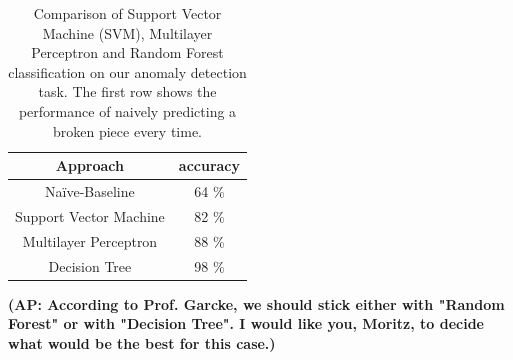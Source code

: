 \documentclass[5p,times,procedia]{elsarticle}
\newcommand{\AP}[1]{{\color{blue} {\bf (AP: #1)}}}
\begin{document}
\begin{table}
       \centering
       \begin{tabular}{ c c } \toprule
              Approach         & accuracy \\ \midrule
              Na\"ive-Baseline & 64 \% \\
              Support Vector Machine & 82 \% \\
              Multilayer Perceptron & 88 \% \\
              Decision Tree         & 98 \% \\ \bottomrule
       \end{tabular}
       \caption{Comparison of Support Vector Machine (SVM), Multilayer Perceptron and 
                Random Forest classification on our anomaly detection task. 
                The first row shows the performance of naively predicting a broken piece
                every time.}
       \label{tab:class_comp}
\end{table}

\AP{According to Prof. Garcke, we should stick either with "Random Forest" or with "Decision Tree". I would like you, Moritz, to decide what would be the best for this case.}
\end{document}
